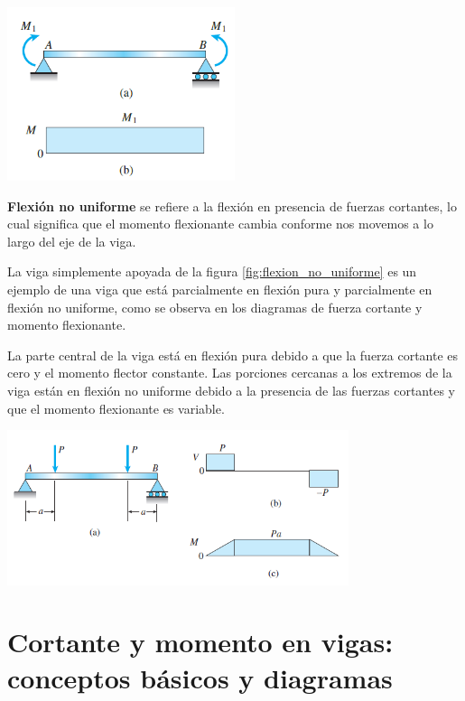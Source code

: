 \documentclass[12pt,letterpaper]{article}
\begin{document}
\begin{center}
\includegraphics[width=0.5\textwidth]{img/viga_flexion_pura.PNG}
\label{fig:flexion_pura}
\end{center}

\textbf{Flexión no uniforme} se refiere a la
flexión en presencia de fuerzas cortantes, lo cual significa que el momento
flexionante cambia conforme nos movemos a lo largo del eje de la viga.

La viga simplemente apoyada de la figura \ref{fig:flexion_no_uniforme} es un ejemplo de una viga que está 
parcialmente en flexión pura y parcialmente en flexión no uniforme, como se observa en los diagramas de 
fuerza cortante y momento flexionante. 

La parte central de la viga está en flexión pura debido a que la fuerza cortante es cero y el momento flector 
constante. Las porciones cercanas a los extremos de la viga están en flexión no uniforme debido a la presencia 
de las fuerzas cortantes y que el momento flexionante es variable.

\begin{center}
\includegraphics[width=0.75\textwidth]{img/viga_flexion_no_uniforme.PNG}
\label{fig:flexion_no_uniforme}
\end{center}


\section{Cortante y momento en vigas: conceptos básicos y diagramas}
\end{document}
